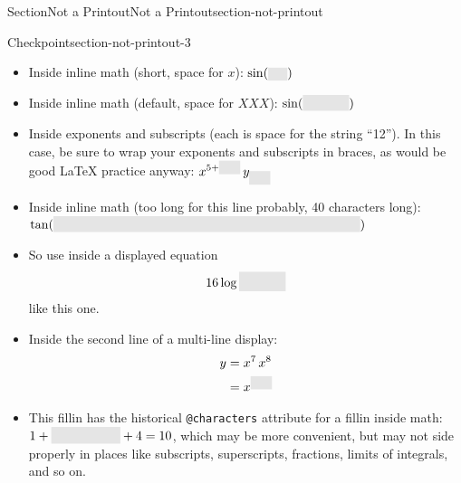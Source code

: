 \documentclass[oneside,10pt,]{article}
\newcommand{\ptxlistdisc}{\raisebox{0.3ex}{\textbullet}}
\newcommand{\ptxmono}[1]{\texttt{#1}}
\newlength{\ptxfillinmaxwidth}
\newlength{\ptxfillincontract}
\newlength{\ptxcharmaxwidth}\setlength{\ptxcharmaxwidth}{0.5em}
\newlength{\ptxcharminwidth}\setlength{\ptxcharminwidth}{0.1em}
\newlength{\ptxfillinheight}
\newcommand{\ptxfillintext}[1]{%
\setlength{\ptxfillinmaxwidth}{#1\ptxcharmaxwidth}%
\setlength{\ptxfillincontract}{#1\ptxcharminwidth}%
\setlength{\ptxfillinheight}{\baselineskip}\addtolength{\ptxfillinheight}{1.2pt}%
\strut\nobreak\leaders\vbox{\hrule width 0.3pt height 0.3pt \vskip -1.2pt}\hskip 1\ptxfillinmaxwidth minus \ptxfillincontract\nobreak\strut%
}
\newcommand{\fillinmath}[1]{\mathchoice{\colorbox{fillinmathshade}{$\displaystyle     \phantom{\,#1\,}$}}{\colorbox{fillinmathshade}{$\textstyle        \phantom{\,#1\,}$}}{\colorbox{fillinmathshade}{$\scriptstyle      \phantom{\,#1\,}$}}{\colorbox{fillinmathshade}{$\scriptscriptstyle\phantom{\,#1\,}$}}}
\numberwithin{equation}{section}
\begin{document}
\begin{sectionptx}{Section}{Not a Printout}{}{Not a Printout}{}{}{section-not-printout}
%
\begin{inlineexercise}{Checkpoint}{}{section-not-printout-3}%
%
\begin{itemize}[label=\ptxlistdisc]
\item{}Inside inline math (short, space for \(x\)): \(\sin(\fillinmath{x})\)%
\item{}Inside inline math (default, space for \(XXX\)): \(\sin(\fillinmath{XXX})\)%
\item{}Inside exponents and subscripts (each is space for the string \textquotedblleft{}12\textquotedblright{}).  In this case, be sure to wrap your exponents and subscripts in braces, as would be good \LaTeX{} practice anyway: \(x^{5+\fillinmath{12}}\,y_{\fillinmath{12}}\)%
\item{}Inside inline math (too long for this line probably, 40 characters long): \(\tan(\fillinmath{Mxxxxxxxxxxxxxxxxxxxxxxxxxxxxxxxxxxxxxxx})\)%
\item{}So use inside a displayed equation%
\begin{equation*}
16\log\space\fillinmath{1-x^2}
\end{equation*}
like this one.%
\item{}Inside the second line of a multi-line display:%
\begin{align*}
y &= x^7\,x^8\\
&= x^{\fillinmath{15}}
\end{align*}
%
\item{}This fillin has the historical \ptxmono{@characters} attribute for a fillin inside math: \(1+\fillinmath{XXXXX}+4=10\), which may be more convenient, but may not side properly in places like subscripts, superscripts, fractions, limits of integrals, and so on.%
\end{itemize}
%
\end{inlineexercise}%
\end{sectionptx}
%
%
\typeout{************************************************}
\typeout{************************************************}
%
\end{document}
